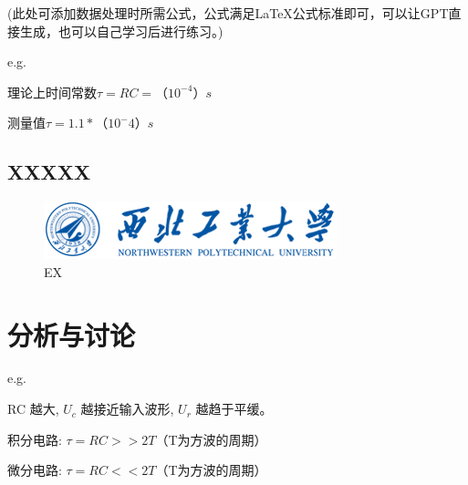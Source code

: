 \documentclass[UTF8]{ctexart}
\begin{document}
\vspace{1em}
(此处可添加数据处理时所需公式，公式满足LaTeX公式标准即可，可以让GPT直接生成，也可以自己学习后进行练习。)

e.g.

理论上时间常数$\tau=RC=（10^{-4}）s$

测量值$\tau=1.1*（10^-{4}）s$

\subsection{XXXXX}
\begin{figure}[htbp]
    \centering
    \includegraphics[width=0.6\linewidth]{logo2.png}
    \caption{EX}
\end{figure}

\section{分析与讨论}

e.g.

RC 越大, $U_c$ 越接近输入波形, $U_r$ 越趋于平缓。

积分电路: $\tau= RC>>2T$（T为方波的周期）

微分电路: $\tau= RC<<2T$（T为方波的周期）
\end{document}
